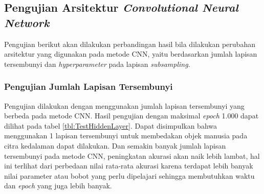 \subsection{Pengujian Arsitektur \textit{Convolutional Neural Network}}
\noindent Pengujian berikut akan dilakukan perbandingan hasil bila dilakukan perubahan arsitektur yang digunakan pada metode CNN, yaitu berdasarkan jumlah lapisan tersembunyi dan \textit{hyperparameter} pada lapisan \textit{subsampling}.\\

\subsubsection{Pengujian Jumlah Lapisan Tersembunyi}
\noindent Pengujian dilakukan dengan menggunakan jumlah lapisan tersembunyi yang berbeda pada metode CNN. Hasil pengujian dengan maksimal \textit{epoch} 1.000 dapat dilihat pada tabel \ref{tbl:TestHiddenLayer}. Dapat disimpulkan bahwa menggunakan 1 lapisan tersembunyi untuk membedakan objek manusia pada citra kedalaman dapat dilakukan. Dan semakin banyak jumlah lapisan tersembunyi pada metode CNN, peningkatan akurasi akan naik lebih lambat, hal ini terlihat dari perbedaan nilai rata-rata akurasi karena terdapat lebih banyak nilai parameter atau bobot yang perlu dipelajari sehingga membutuhkan waktu dan \textit{epoch} yang juga lebih banyak.

